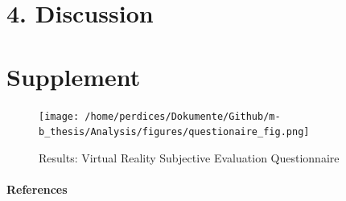 \documentclass[12pt,oneside,openright]{report}
\begin{document}
\section*{4. Discussion}

\pagebreak

\newpage



\section*{Supplement}
    \begin{figure}[H]
        \centering
        \texttt{[image: /home/perdices/Dokumente/Github/m-b\_thesis/Analysis/figures/questionaire\_fig.png]}
        \caption{Results: Virtual Reality Subjective Evaluation Questionnaire}
        \label{fig:mesh2}
    \end{figure}
  

\pagebreak
\paragraph{\textbf{References}}
\printbibliography[heading=none]
\end{document}

